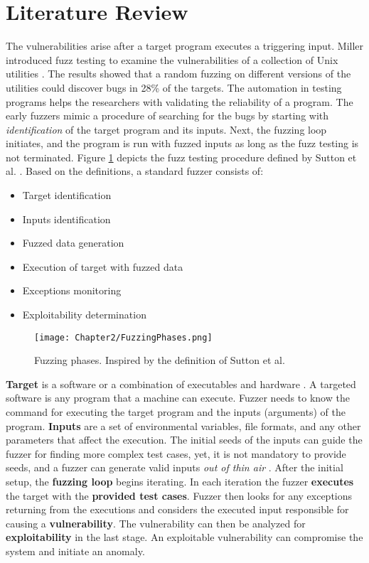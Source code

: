 \section{Literature Review} \label{sec:2.2}

The vulnerabilities arise after a target program executes a triggering input. Miller introduced fuzz testing to examine the vulnerabilities of a collection of Unix utilities \cite{miller1990empirical}. The results showed that a random fuzzing on different versions of the utilities could discover bugs in 28\% of the targets. The automation in testing programs helps the researchers with validating the reliability of a program. The early fuzzers mimic a procedure of searching for the bugs by starting with \textit{identification} of the target program and its inputs. Next, the fuzzing loop initiates, and the program is run with fuzzed inputs as long as the fuzz testing is not terminated. Figure \ref{fig:fuzz_phases} depicts the fuzz testing procedure defined by Sutton et al. \cite{sutton2007fuzzing}. Based on the definitions, a standard fuzzer consists of:

\begin{itemize}
    \item Target identification
    \item Inputs identification
    \item Fuzzed data generation
    \item Execution of target with fuzzed data
    \item Exceptions monitoring
    \item Exploitability determination
\end{itemize}

\begin{figure}[!b]
    \texttt{[image: Chapter2/FuzzingPhases.png]}
    \centering
    \caption{Fuzzing phases. Inspired by the definition of Sutton et al. \cite{sutton2007fuzzing}}
    \label{fig:fuzz_phases}
\end{figure}

\textbf{Target} is a software or a combination of executables and hardware \cite{song2019periscope}. A targeted software is any program that a machine can execute. 
Fuzzer needs to know the command for executing the target program and the inputs (arguments) of the program. \textbf{Inputs} are a set of environmental variables, file formats, and any other parameters that affect the execution. The initial seeds of the inputs can guide the fuzzer for finding more complex test cases, yet, it is not mandatory to provide seeds, and a fuzzer can generate valid inputs \textit{out of thin air} \cite{out_of_thin_air}. After the initial setup, the \textbf{fuzzing loop} begins iterating. In each iteration the fuzzer \textbf{executes} the target with the \textbf{provided test cases}. Fuzzer then looks for any exceptions returning from the executions and considers the executed input responsible for causing a \textbf{vulnerability}. The vulnerability can then be analyzed for \textbf{exploitability} in the last stage. An exploitable vulnerability can compromise the system and initiate an anomaly.

